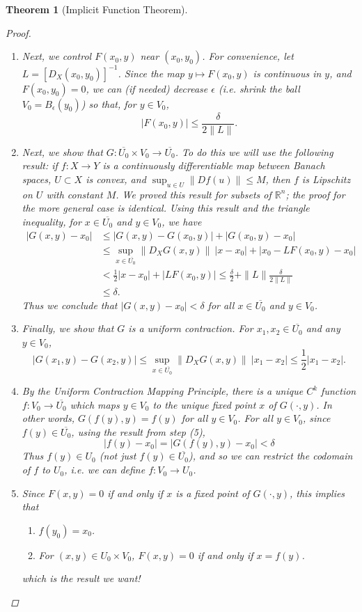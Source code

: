 \documentclass[12pt]{amsart}         %
\newtheorem{theorem}{Theorem}[section]
\theoremstyle{remark}
\newcommand{\R}{\mathbb{R}}
\begin{document}
\begin{theorem}[Implicit Function Theorem]
\begin{proof}
\begin{enumerate}
\item Next, we control $F(x_0, y)$ near $(x_0, y_0)$. For convenience, let $L = [D_X(x_0, y_0)]^{-1}$. Since  the map $y \mapsto F(x_0, y)$ is continuous in $y$, and $F(x_0, y_0) = 0$, we can (if needed) decrease $\epsilon$ (i.e. shrink the ball $V_0 = B_\epsilon(y_0)$) so that, for $y \in V_0$,
\[
|F(x_0, y)| \leq \frac{\delta}{2 \|L\|}.
\]

\item Next, we show that $G: \overline{U_0} \times V_0 \rightarrow \overline{U_0}$. To do this we will use the following result: if $f: X \rightarrow Y$ is a continuously differentiable map between Banach spaces, $U \subset X$ is convex, and $\sup_{u \in U} \|Df(u)\| \leq M$, then $f$ is Lipschitz on $U$ with constant $M$. We proved this result for subsets of $\R^n$; the proof for the more general case is identical. Using this result and the triangle inequality, for $x \in \overline{U_0}$ and $y \in V_0$, we have
\begin{align*}
|G(x, y) - x_0| &\leq |G(x, y) - G(x_0, y)| + |G(x_0, y) - x_0| \\
&\leq \sup_{x\in \overline{U_0}}\|D_XG(x, y)\|\:|x - x_0| + |x_0 - L F(x_0, y) - x_0 | \\
&< \frac{1}{2} |x - x_0| + |L F(x_0, y)|
\leq \frac{\delta}{2} + \|L\| \frac{\delta}{2 \|L\|} \\
&\leq \delta.
\end{align*} 
Thus we conclude that $|G(x, y) - x_0| < \delta$ for all $x \in \overline{U_0}$ and $y \in V_0$.

\item Finally, we show that $G$ is a uniform contraction. For $x_1, x_2 \in \overline{U_0}$ and any $y \in V_0$,
\[
|G(x_1, y) - G(x_2, y)| \leq \sup_{x\in \overline{U_0}}\|D_XG(x, y)\|\:|x_1 - x_2| \leq \frac{1}{2}|x_1 - x_2|.
\]

\item By the Uniform Contraction Mapping Principle, there is a unique $C^k$ function $f: V_0 \rightarrow \overline{U_0}$ which maps $y \in V_0$ to the unique fixed point $x$ of $G(\cdot, y)$. In other words, $G(f(y),y) = f(y)$ for all $y \in V_0$. For all $y \in V_0$, since $f(y) \in \overline{U_0}$, using the result from step (5),
\[
|f(y) - x_0| = |G(f(y), y) - x_0| < \delta
\]
Thus $f(y) \in U_0$ (not just $f(y) \in \overline{U_0}$), and so we can restrict the codomain of $f$ to $U_0$, i.e. we can define $f: V_0 \rightarrow U_0$.

\item Since $F(x, y) = 0$ if and only if $x$ is a fixed point of $G(\cdot, y)$, this implies that 
	\begin{enumerate}
	\item $f(y_0) = x_0$.
	\item For $(x, y) \in U_0 \times V_0$, $F(x, y) = 0$ if and only if $x = f(y)$.
	\end{enumerate}
which is the result we want!


\end{enumerate}
\end{proof}
\end{theorem}
\end{document}
